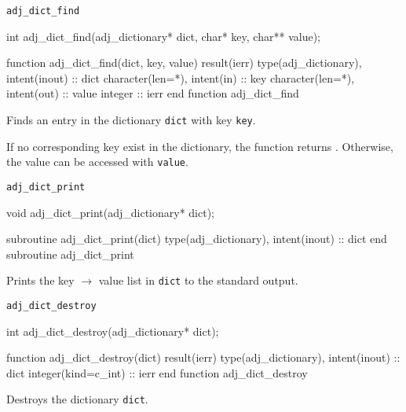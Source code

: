 \begin{boxwithtitle}{\texttt{adj_dict_find}}
\begin{minipage}{\columnwidth}
\begin{ccode}
  int adj_dict_find(adj_dictionary* dict, char* key, char** value);
\end{ccode}
\begin{fortrancode}
  function adj_dict_find(dict, key, value) result(ierr)
    type(adj_dictionary), intent(inout) :: dict
    character(len=*), intent(in) :: key
    character(len=*), intent(out) :: value
    integer :: ierr
  end function adj_dict_find
\end{fortrancode}
\end{minipage}
\end{boxwithtitle}

Finds an entry in the dictionary \texttt{dict} with key \texttt{key}.

If no corresponding key exist in the dictionary, the function returns .
Otherwise, the value can be accessed with \texttt{value}.



\begin{boxwithtitle}{\texttt{adj_dict_print}}
\begin{minipage}{\columnwidth}
\begin{ccode}
  void adj_dict_print(adj_dictionary* dict);
\end{ccode}
\begin{fortrancode}
  subroutine adj_dict_print(dict)
    type(adj_dictionary), intent(inout) :: dict
  end subroutine adj_dict_print
\end{fortrancode}
\end{minipage}
\end{boxwithtitle}

Prints the key $\to$ value list in \texttt{dict} to the standard output. 

\begin{boxwithtitle}{\texttt{adj_dict_destroy}}
\begin{minipage}{\columnwidth}
\begin{ccode}
  int adj_dict_destroy(adj_dictionary* dict);
\end{ccode}
\begin{fortrancode}
  function adj_dict_destroy(dict) result(ierr)
    type(adj_dictionary), intent(inout) :: dict
    integer(kind=c_int) :: ierr
  end function adj_dict_destroy
\end{fortrancode}
\end{minipage}
\end{boxwithtitle}

Destroys the dictionary \texttt{dict}.

